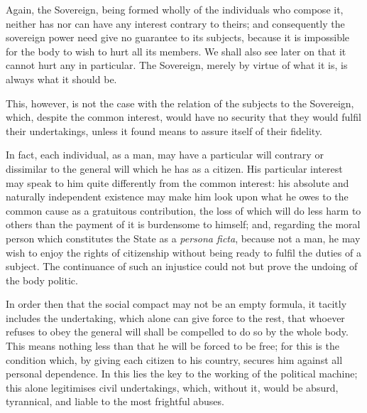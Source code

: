 \documentclass[12pt]{report}
\begin{document}
Again, the Sovereign, being formed wholly of the individuals who compose it, neither has nor can have any interest contrary to theirs; and consequently the sovereign power need give no guarantee to its subjects, because it is impossible for the body to wish to hurt all its members. We shall also see later on that it cannot hurt any in particular. The Sovereign, merely by virtue of what it is, is always what it should be.

This, however, is not the case with the relation of the subjects to the Sovereign, which, despite the common interest, would have no security that they would fulfil their undertakings, unless it found means to assure itself of their fidelity.

In fact, each individual, as a man, may have a particular will contrary or dissimilar to the general will which he has as a citizen. His particular interest may speak to him quite differently from the common interest: his absolute and naturally independent existence may make him look upon what he owes to the common cause as a gratuitous contribution, the loss of which will do less harm to others than the payment of it is burdensome to himself; and, regarding the moral person which constitutes the State as a \textit{persona ficta}, because not a man, he may wish to enjoy the rights of citizenship without being ready to fulfil the duties of a subject. The continuance of such an injustice could not but prove the undoing of the body politic.

In order then that the social compact may not be an empty formula, it tacitly includes the undertaking, which alone can give force to the rest, that whoever refuses to obey the general will shall be compelled to do so by the whole body. This means nothing less than that he will be forced to be free; for this is the condition which, by giving each citizen to his country, secures him against all personal dependence. In this lies the key to the working of the political machine; this alone legitimises civil undertakings, which, without it, would be absurd, tyrannical, and liable to the most frightful abuses.
\end{document}
